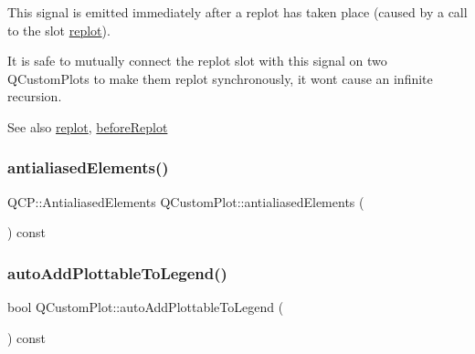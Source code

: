 This signal is emitted immediately after a replot has taken place (caused by a call to the slot \mbox{\hyperlink{class_q_custom_plot_aa4bfe7d70dbe67e81d877819b75ab9af}{replot}}).

It is safe to mutually connect the replot slot with this signal on two Q\+Custom\+Plots to make them replot synchronously, it won\textquotesingle{}t cause an infinite recursion.

\begin{DoxySeeAlso}{See also}
\mbox{\hyperlink{class_q_custom_plot_aa4bfe7d70dbe67e81d877819b75ab9af}{replot}}, \mbox{\hyperlink{class_q_custom_plot_a0cd30e29b73efd6afe096e44bc5956f5}{before\+Replot}} 
\end{DoxySeeAlso}
\mbox{\label{class_q_custom_plot_a631762eb183aceecee73d30e108641ee}} 
\subsubsection{\texorpdfstring{antialiasedElements()}{antialiasedElements()}}
{\footnotesize\ttfamily Q\+C\+P\+::\+Antialiased\+Elements Q\+Custom\+Plot\+::antialiased\+Elements (\begin{DoxyParamCaption}{ }\end{DoxyParamCaption}) const\hspace{0.3cm}{\ttfamily [inline]}}

\mbox{\label{class_q_custom_plot_ac4b87de13eaceadc8db5a66654197689}} 
\subsubsection{\texorpdfstring{autoAddPlottableToLegend()}{autoAddPlottableToLegend()}}
{\footnotesize\ttfamily bool Q\+Custom\+Plot\+::auto\+Add\+Plottable\+To\+Legend (\begin{DoxyParamCaption}{ }\end{DoxyParamCaption}) const\hspace{0.3cm}{\ttfamily [inline]}}

\mbox{\label{class_q_custom_plot_abf635f8b56ab5c16d5de9f358543e82b}} 
